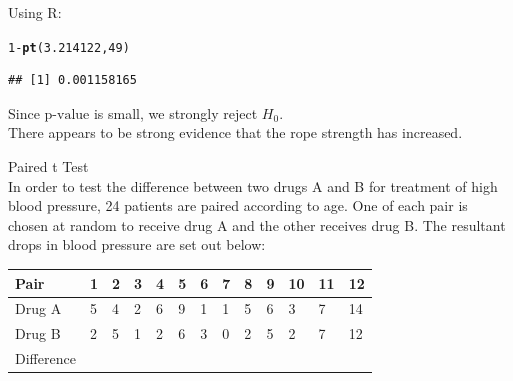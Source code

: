 \documentclass[bigtut]{tutorial}\usepackage[]{graphicx}\usepackage[]{color}
\makeatletter
\newcommand{\hlnum}[1]{\textcolor[rgb]{0.686,0.059,0.569}{#1}}%
\newcommand{\hlopt}[1]{\textcolor[rgb]{0,0,0}{#1}}%
\newcommand{\hlstd}[1]{\textcolor[rgb]{0.345,0.345,0.345}{#1}}%
\newcommand{\hlkwd}[1]{\textcolor[rgb]{0.737,0.353,0.396}{\textbf{#1}}}%
\newenvironment{kframe}{%
 \def\at@end@of@kframe{}%
 \ifinner\ifhmode%
  \def\at@end@of@kframe{\end{minipage}}%
  \begin{minipage}{\columnwidth}%
 \fi\fi%
 \def\FrameCommand##1{\hskip\@totalleftmargin \hskip-\fboxsep
 \colorbox{shadecolor}{##1}\hskip-\fboxsep
     \hskip-\linewidth \hskip-\@totalleftmargin \hskip\columnwidth}%
 \MakeFramed {\advance\hsize-\width
   \@totalleftmargin\z@ \linewidth\hsize
   \@setminipage}}%
 {\par\unskip\endMakeFramed%
 \at@end@of@kframe}
\newenvironment{knitrout}{}{} %
\makeatother
\begin{document}
\begin{tutorial}
\begin{questions}
\begin{solution}
Using R:
\begin{knitrout}
\color{fgcolor}\begin{kframe}
\begin{alltt}
\hlnum{1}\hlopt{-}\hlkwd{pt}\hlstd{(}\hlnum{3.214122}\hlstd{,}\hlnum{49}\hlstd{)}
\end{alltt}
\begin{verbatim}
## [1] 0.001158165
\end{verbatim}
\end{kframe}
\end{knitrout}

\vspace{.5cm}
Since $\text{p-value}$ is small, we strongly reject $H_{0}$. \\
There appears to be strong evidence that the rope strength has increased.
\end{solution}



\question Paired t Test \\

In order to test the difference between two drugs A and B for treatment of high blood pressure, 24 patients are paired according to age. One of each pair is chosen at random to receive drug A and the other receives drug B. 
The resultant drops in blood pressure are set out below:

\begin{center}
\begin{tabular}{| l | l | l | l | l | l | l | l | l | l | l | l | l |} \hline
Pair & 1 & 2 & 3 & 4 & 5 & 6 & 7 & 8 & 9 & 10 & 11 & 12 \\ \hline
Drug A & 5 & 4 & 2 & 6 & 9 & 1  &1 & 5  & 6 & 3 & 7 & 14 \\ 
Drug B & 2 & 5 & 1  & 2  &6 & 3 & 0  & 2 & 5 & 2  & 7 & 12 \\ \hline
Difference & & & & & & & & & & & & \\ \hline
\end{tabular}
\end{center}

\vspace{.5cm}
\end{questions}
\end{tutorial}
\end{document}

